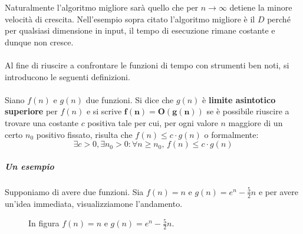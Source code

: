 \documentclass[11pt,a4paper,oneside]{article}
\begin{document}
Naturalmente l'algoritmo migliore sarà quello che per $n \to \infty$ detiene la minore velocità di crescita. Nell'esempio sopra citato l'algoritmo migliore è il $D$ perché per qualsiasi dimensione in input, il tempo di esecuzione rimane costante e dunque non cresce.

\paragraph*{} Al fine di riuscire a confrontare le funzioni di tempo con strumenti ben noti, si introducono le seguenti definizioni.
\paragraph{} Siano $f(n)$ e $g(n)$ due funzioni. Si dice che $g(n)$ è \textbf{limite asintotico superiore} per $f(n)$ e si scrive $\bm{f(n) = O(g(n))}$ se è possibile riuscire a trovare una costante $c$ positiva tale per cui, per ogni valore $n$ maggiore di un certo $n_0$ positivo fissato, risulta che $f(n) \leq  c\cdot g(n)$ o formalmente: $$\exists c>0, \exists n_0 > 0 : \forall n \geq n_0,\,f(n) \leq c\cdot g(n)$$
\subparagraph*{Un esempio} Supponiamo di avere due funzioni. Sia $f(n) = n$ e $g(n) = e^n-\frac{5}{2}n$ e per avere un'idea immediata, visualizziamone l'andamento.

\begin{figure}[hb]
\centering
{}
\caption{In figura $f(n) = n$ e $g(n) = e^n-\frac{5}{2}n$.}
\label{fig:asymsup}
\end{figure}
\end{document}

